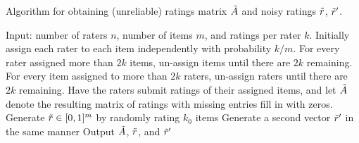 \begin{algorithm}[b!]
\caption{Algorithm for obtaining (unreliable) ratings matrix $\tilde{A}$ and noisy 
ratings $\tilde{r}$, $\tilde{r}'$.}
\label{alg:create-A}
\begin{algorithmic}[1]
\State Input: number of raters $n$,  number of items $m$, and ratings per rater $k$.
\State Initially assign each rater to each item independently with probability $k/m$.  
\State For every rater assigned more than $2k$ items, un-assign items until 
       there are $2k$ remaining.
\State For every item assigned to more than $2k$
       raters, un-assign raters until there are $2k$ remaining.
\State Have the raters submit ratings of their assigned items, and let $\tilde{A}$ 
       denote the resulting matrix of ratings with missing entries fill in with 
       zeros.
\State Generate $\tilde{r} \in [0,1]^m$ by randomly rating $k_0$ items
\State Generate a second vector $\tilde{r}'$ in the same manner
\State Output $\tilde{A}$, $\tilde{r}$, and $\tilde{r}'$
\end{algorithmic}
\end{algorithm}


